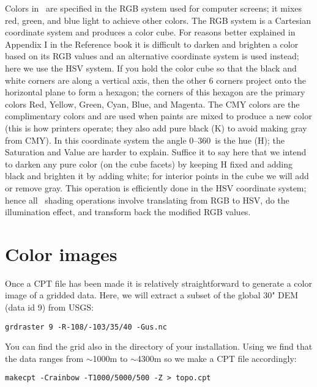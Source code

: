\documentclass[11pt]{report}
\begin{document}
Colors in \GMT\ are specified in the RGB system used for computer
screens; it mixes red, green, and blue light to achieve other colors.
The RGB system is a Cartesian coordinate system and produces a color cube.
For reasons better explained in Appendix I in the Reference book it is
difficult to darken and brighten a color based on its RGB values and an
alternative coordinate system is used instead; here we use the HSV system.
If you hold the color cube so that the black and white corners are along
a vertical axis, then the other 6 corners project onto the horizontal plane to
form a hexagon; the corners of this hexagon are the primary colors Red,
Yellow, Green, Cyan, Blue, and Magenta.
The CMY colors are the complimentary colors and are used when paints are
mixed to produce a new color (this is how printers operate; they also add
pure black (K) to avoid making gray from CMY).  In this coordinate system the
angle 0--360\DS\ is the hue (H); the Saturation and Value are harder to
explain.  Suffice it to say here that we intend to darken any pure color
(on the cube facets) by keeping H fixed and adding black and brighten it by adding white; for
interior points in the cube we will add or remove gray.
This operation is efficiently done in the HSV coordinate system; hence all
\GMT\ shading operations involve translating from RGB to HSV, do the
illumination effect, and transform back the modified RGB values.

\section{Color images}

Once a CPT file has been made it is relatively straightforward to generate
a color image of a gridded data.  Here, we will extract a subset of the
global 30" DEM (data id 9) from USGS:

{\small\begin{verbatim}
grdraster 9 -R-108/-103/35/40 -Gus.nc
\end{verbatim}
}

You can find the grid  also in the  directory
of your \GMT{} installation.
Using  we find that the data ranges from $\sim$1000m to
\noindent
$\sim$4300m so we make a CPT file accordingly:

{\small\begin{verbatim}
makecpt -Crainbow -T1000/5000/500 -Z > topo.cpt
\end{verbatim}
}
\end{document}
